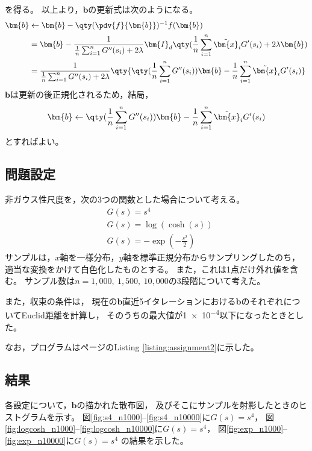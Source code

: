 \documentclass[class=jsarticle, crop=false, dvipdfmx, fleqn]{standalone}
\begin{document}
を得る。
以上より，\(\bm{b}\)の更新式は次のようになる。
\begin{align}
    \bm{b}
        & \leftarrow \bm{b} - \qty(\pdv{f}{\bm{b}})^{-1} f(\bm{b}) \\
        & = \bm{b} - \frac{1}{\frac{1}{n} \sum_{i=1}^{n} G^{\prime\prime} (s_i) + 2\lambda} \bm{I}_d \qty(\frac{1}{n} \sum_{i=1}^{n} \tilde{\bm{x}}_i G^\prime (s_i) + 2 \lambda\bm{b}) \\
        & = \frac{1}{\frac{1}{n} \sum_{i=1}^{n} G^{\prime\prime} (s_i) + 2\lambda} \qty{\qty(\frac{1}{n} \sum_{i=1}^{n} G^{\prime\prime} (s_i)) \bm{b} - \frac{1}{n} \sum_{i=1}^{n} \tilde{\bm{x}}_i G^\prime (s_i)}
\end{align}
\(\bm{b}\)は更新の後正規化されるため，結局，
\begin{equation}
    \bm{b} \leftarrow \qty(\frac{1}{n} \sum_{i=1}^{n} G^{\prime\prime} (s_i)) \bm{b} - \frac{1}{n} \sum_{i=1}^{n} \tilde{\bm{x}}_i G^\prime (s_i)
\end{equation}
とすればよい。



\subsection*{問題設定}

非ガウス性尺度を，次の3つの関数とした場合について考える。
\begin{align}
    & G(s) = s^4 \\
    & G(s) = \log(\cosh(s)) \\
    & G(s) = - \exp(- \frac{s^2}{2})
\end{align}
サンプルは，\(x\)軸を一様分布，\(y\)軸を標準正規分布からサンプリングしたのち，
適当な変換をかけて白色化したものとする。
また，これは1点だけ外れ値を含む。
サンプル数は\(n = 1,000,\ 1,500,\ 10,000\)の3段階について考えた。

また，収束の条件は，
現在の\(\bm{b}\)直近5イタレーションにおける\(\bm{b}\)のそれぞれについてEuclid距離を計算し，
そのうちの最大値が\num{1e-4}以下になったときとした。

なお，プログラムは\pageref{listing:assignment2}ページのListing \ref{listing:assignment2}に示した。



\subsection*{結果}

各設定について，\(\bm{b}\)の描かれた散布図，
及びそこにサンプルを射影したときのヒストグラムを示す。
図\ref{fig:s4_n1000}--\ref{fig:s4_n10000}に\(G(s) = s^4\)，
図\ref{fig:logcosh_n1000}--\ref{fig:logcosh_n10000}に\(G(s) = s^4\)，
図\ref{fig:exp_n1000}--\ref{fig:exp_n10000}に\(G(s) = s^4\)
の結果を示した。
\end{document}
